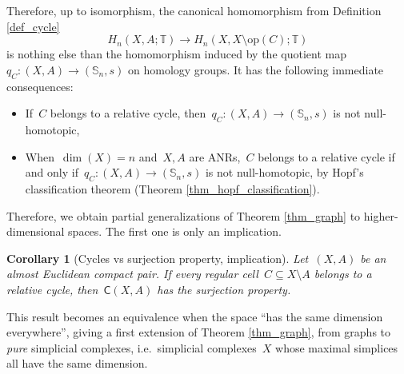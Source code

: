 \documentclass[english,11pt]{article}
\theoremstyle{plain}
\newtheorem{corollary}{Corollary}[section]
\theoremstyle{remark}
\theoremstyle{definition}
\newcommand{\op}[1]{\mathrm{op}(#1)}
\newcommand{\Sp}{\mathbb{S}}
\newcommand{\R}{\mathbb{R}}
\newcommand{\Z}{\mathbb{Z}}
\newcommand{\RZ}{\mathbb{T}}%
\newcommand{\C}[1]{\mathsf{C}(#1)}%
\begin{document}
Therefore, up to isomorphism, the canonical homomorphism from Definition \ref{def_cycle}
\begin{equation*}
H_n(X,A;\RZ)\to H_n(X,X\setminus \op{C};\RZ)
\end{equation*}
is nothing else than the homomorphism induced by the quotient map~$q_C:(X,A)\to (\Sp_n,s)$ on homology groups. It has the following immediate consequences:
\begin{itemize}
\item If~$C$ belongs to a relative cycle, then~$q_C:(X,A)\to (\Sp_n,s)$ is not null-homotopic,
\item When~$\dim(X)=n$ and~$X,A$ are ANRs,~$C$ belongs to a relative cycle if and only if~$q_C:(X,A)\to (\Sp_n,s)$ is not null-homotopic, by Hopf's classification theorem (Theorem \ref{thm_hopf_classification}).
\end{itemize}

Therefore, we obtain partial generalizations of Theorem \ref{thm_graph} to higher-dimensional spaces. The first one is only an implication.

\begin{corollary}[Cycles vs surjection property, implication]\label{cor_implication}
Let~$(X,A)$ be an almost Euclidean compact pair. If every regular cell~$C\subseteq X\setminus A$ belongs to a relative cycle, then~$\C{X,A}$ has the surjection property.
\end{corollary}


This result becomes an equivalence when the space ``has the same dimension everywhere'', giving a first extension of Theorem \ref{thm_graph}, from graphs to \emph{pure} simplicial complexes, i.e.~simplicial complexes~$X$ whose maximal simplices all have the same dimension.
\end{document}
